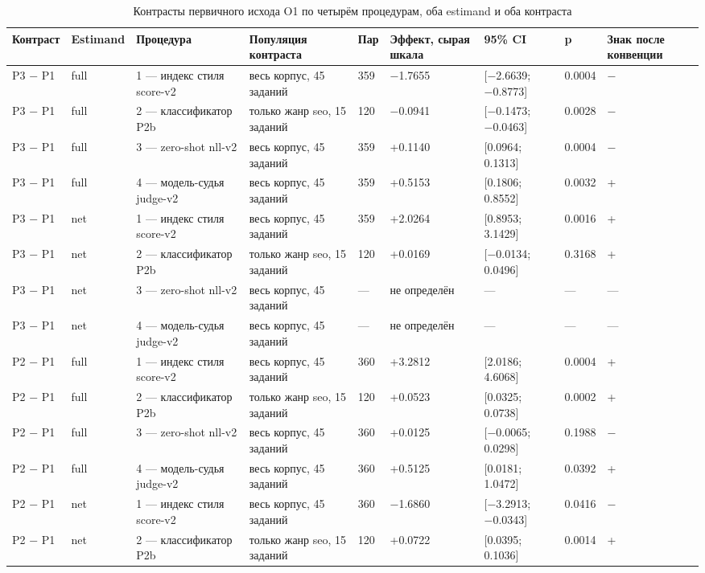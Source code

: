 \begin{table}
\centering
\scriptsize
\caption{Контрасты первичного исхода O1 по четырём процедурам, оба estimand и оба контраста}
\label{tab:3}
\begin{tabular}{lllllllll}
\toprule
Контраст & Estimand & Процедура & Популяция контраста & Пар & Эффект, сырая шкала & 95\% CI & p & Знак после конвенции \\
\midrule
P3 − P1 & full & 1 — индекс стиля score-v2 & весь корпус, 45 заданий & 359 & −1.7655 & [−2.6639; −0.8773] & 0.0004 & − \\
P3 − P1 & full & 2 — классификатор P2b & только жанр seo, 15 заданий & 120 & −0.0941 & [−0.1473; −0.0463] & 0.0028 & − \\
P3 − P1 & full & 3 — zero-shot nll-v2 & весь корпус, 45 заданий & 359 & +0.1140 & [0.0964; 0.1313] & 0.0004 & − \\
P3 − P1 & full & 4 — модель-судья judge-v2 & весь корпус, 45 заданий & 359 & +0.5153 & [0.1806; 0.8552] & 0.0032 & + \\
P3 − P1 & net & 1 — индекс стиля score-v2 & весь корпус, 45 заданий & 359 & +2.0264 & [0.8953; 3.1429] & 0.0016 & + \\
P3 − P1 & net & 2 — классификатор P2b & только жанр seo, 15 заданий & 120 & +0.0169 & [−0.0134; 0.0496] & 0.3168 & + \\
P3 − P1 & net & 3 — zero-shot nll-v2 & весь корпус, 45 заданий & — & не определён & — & — & — \\
P3 − P1 & net & 4 — модель-судья judge-v2 & весь корпус, 45 заданий & — & не определён & — & — & — \\
P2 − P1 & full & 1 — индекс стиля score-v2 & весь корпус, 45 заданий & 360 & +3.2812 & [2.0186; 4.6068] & 0.0004 & + \\
P2 − P1 & full & 2 — классификатор P2b & только жанр seo, 15 заданий & 120 & +0.0523 & [0.0325; 0.0738] & 0.0002 & + \\
P2 − P1 & full & 3 — zero-shot nll-v2 & весь корпус, 45 заданий & 360 & +0.0125 & [−0.0065; 0.0298] & 0.1988 & − \\
P2 − P1 & full & 4 — модель-судья judge-v2 & весь корпус, 45 заданий & 360 & +0.5125 & [0.0181; 1.0472] & 0.0392 & + \\
P2 − P1 & net & 1 — индекс стиля score-v2 & весь корпус, 45 заданий & 360 & −1.6860 & [−3.2913; −0.0343] & 0.0416 & − \\
P2 − P1 & net & 2 — классификатор P2b & только жанр seo, 15 заданий & 120 & +0.0722 & [0.0395; 0.1036] & 0.0014 & + \\

\end{tabular}
\end{table}
